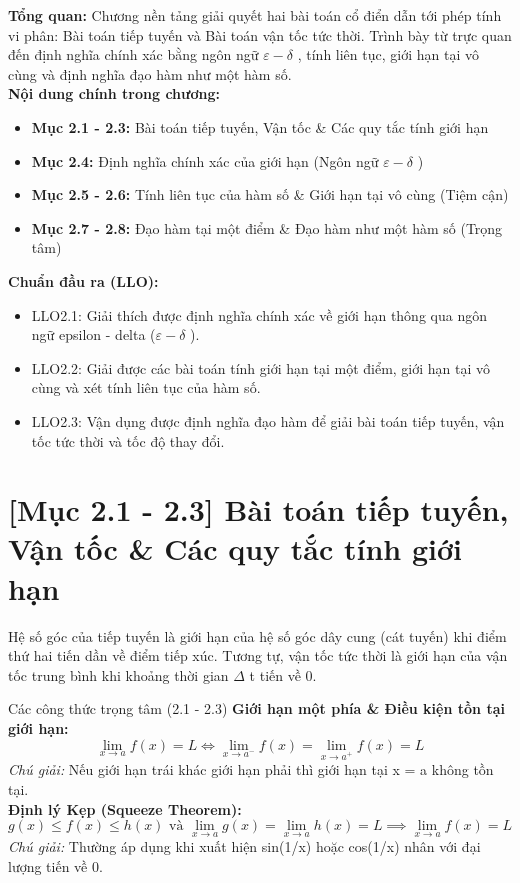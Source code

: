 \documentclass[11pt,a4paper,oneside]{book}
\begin{document}
\begin{tcolorbox}[colback=slate!5!white,colframe=slate!75!black,title={\textbf{Mục lục Chương 2 \& Chuẩn đầu ra (Buổi 1 - 2)}}]
\textbf{Tổng quan:} Chương nền tảng giải quyết hai bài toán cổ điển dẫn tới phép tính vi phân: Bài toán tiếp tuyến và Bài toán vận tốc tức thời. Trình bày từ trực quan đến định nghĩa chính xác bằng ngôn ngữ $\varepsilon - \delta$ , tính liên tục, giới hạn tại vô cùng và định nghĩa đạo hàm như một hàm số.\\[6pt]
\textbf{Nội dung chính trong chương:}
\begin{itemize}[leftmargin=1.5em, itemsep=2pt]
  \item \textbf{Mục 2.1 - 2.3:} Bài toán tiếp tuyến, Vận tốc \& Các quy tắc tính giới hạn
  \item \textbf{Mục 2.4:} Định nghĩa chính xác của giới hạn (Ngôn ngữ $\varepsilon - \delta$ )
  \item \textbf{Mục 2.5 - 2.6:} Tính liên tục của hàm số \& Giới hạn tại vô cùng (Tiệm cận)
  \item \textbf{Mục 2.7 - 2.8:} Đạo hàm tại một điểm \& Đạo hàm như một hàm số (Trọng tâm)
\end{itemize}
\textbf{Chuẩn đầu ra (LLO):}
\begin{itemize}[leftmargin=1.5em, itemsep=2pt]
  \item LLO2.1: Giải thích được định nghĩa chính xác về giới hạn thông qua ngôn ngữ epsilon - delta ($\varepsilon - \delta$ ).
  \item LLO2.2: Giải được các bài toán tính giới hạn tại một điểm, giới hạn tại vô cùng và xét tính liên tục của hàm số.
  \item LLO2.3: Vận dụng được định nghĩa đạo hàm để giải bài toán tiếp tuyến, vận tốc tức thời và tốc độ thay đổi.
\end{itemize}
\end{tcolorbox}

\section{[Mục 2.1 - 2.3] Bài toán tiếp tuyến, Vận tốc \& Các quy tắc tính giới hạn}
Hệ số góc của tiếp tuyến là giới hạn của hệ số góc dây cung (cát tuyến) khi điểm thứ hai tiến dần về điểm tiếp xúc. Tương tự, vận tốc tức thời là giới hạn của vận tốc trung bình khi khoảng thời gian $\Delta$ t tiến về 0.

\begin{congthuc}{Các công thức trọng tâm (2.1 - 2.3)}
\noindent\textbf{Giới hạn một phía \& Điều kiện tồn tại giới hạn:}
\[ \lim_{x \to a} f(x) = L \iff \lim_{x \to a^-} f(x) = \lim_{x \to a^+} f(x) = L \]
\noindent\textit{Chú giải:} Nếu giới hạn trái khác giới hạn phải thì giới hạn tại x = a không tồn tại.\\[4pt]
\noindent\textbf{Định lý Kẹp (Squeeze Theorem):}
\[ g(x) \le f(x) \le h(x) \text{ và } \lim_{x \to a} g(x) = \lim_{x \to a} h(x) = L \implies \lim_{x \to a} f(x) = L \]
\noindent\textit{Chú giải:} Thường áp dụng khi xuất hiện sin(1/x) hoặc cos(1/x) nhân với đại lượng tiến về 0.\\[4pt]
\end{congthuc}
\end{document}

